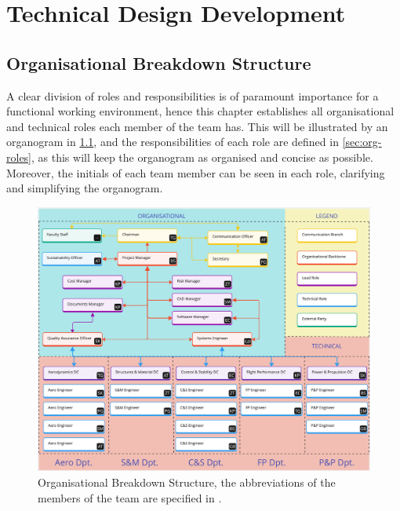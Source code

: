 \chapter{Technical Design Development}\label{ch:techdesdev}


\section{Organisational Breakdown Structure}\label{sec:orgbreakdown}
A clear division of roles and responsibilities is of paramount importance for a functional working environment, hence this chapter establishes all organisational and technical roles each member of the team has. This will be illustrated by an organogram in \cref{fig:orgbreakdownstruc}, and the responsibilities of each role are defined in \cref{sec:org-roles}, as this will keep the organogram as organised and concise as possible. Moreover, the initials of each team member can be seen in each role, clarifying and simplifying the organogram.

\begin{figure}[ht]
    \centering
    \includegraphics[width=\linewidth]{figures/Copy OBS.jpg}
    \caption{Organisational Breakdown Structure, the abbreviations of the members of the team are specified in .}
    \label{fig:orgbreakdownstruc}
\end{figure}


